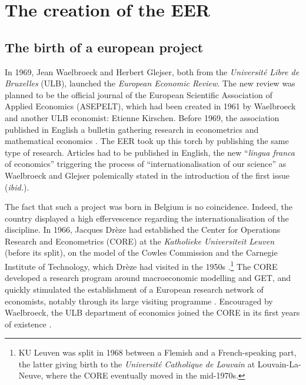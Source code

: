 \documentclass[]{elsarticle} %
\begin{document}
\hypertarget{EER-creation}{%
\section{The creation of the EER}\label{EER-creation}}

\hypertarget{the-birth-of-a-european-project}{%
\subsection{The birth of a european
project}\label{the-birth-of-a-european-project}}

In 1969, Jean Waelbroeck and Herbert Glejser, both from the
\emph{Université Libre de Bruxelles} (ULB), launched the \emph{European
Economic Review}. The new review was planned to be the official journal
of the European Scientific Association of Applied Economics (ASEPELT),
which had been created in 1961 by Waelbroeck and another ULB economist:
Etienne Kirschen. Before 1969, the association published in English a
bulletin gathering research in econometrics and mathematical economics
\citep[4]{waelbroeck1969}. The EER took up this torch by publishing the
same type of research. Articles had to be published in English, the new
``\emph{lingua franca} of economics'' triggering the process of
``internationalisation of our science'' as Waelbroeck and Glejser
polemically stated in the introduction of the first issue
(\emph{ibid.}).

The fact that such a project was born in Belgium is no coincidence.
Indeed, the country displayed a high effervescence regarding the
internationalisation of the discipline. In 1966, Jacques Drèze had
established the Center for Operations Research and Econometrics (CORE)
at the \emph{Katholieke Universiteit Leuven} (before its split), on the
model of the Cowles Commission and the Carnegie Institute of Technology,
which Drèze had visited in the 1950s \citep{duppe2017}.\footnote{KU
  Leuven was split in 1968 between a Flemish and a French-speaking part,
  the latter giving birth to the \emph{Université Catholique de Louvain}
  at Louvain-La-Neuve, where the CORE eventually moved in the mid-1970s.}
The CORE developed a research program around macroeconomic modelling and
GET, and quickly stimulated the establishment of a European research
network of economists, notably through its large visiting programme
\citep{maes2005, duppe2017}. Encouraged by Waelbroeck, the ULB
department of economics joined the CORE in its first years of existence
\citep[79]{maes2005}.
\end{document}
